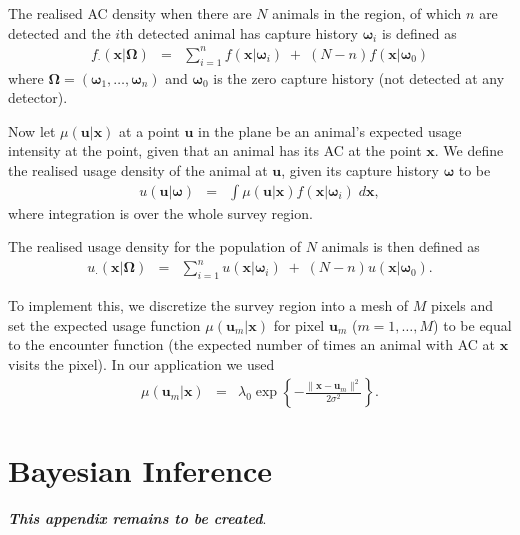 \documentclass[10pt,a4paper]{article}
\begin{document}
The realised AC density when there are $N$ animals in the region, of which $n$ are detected and the $i$th detected animal has capture history $\bm{\omega}_i$ is defined as
\begin{eqnarray*}
f_\cdot(\bm{x}|\bm{\Omega})&=&\sum_{i=1}^nf(\bm{x}|\bm{\omega}_i)\;+\;(N-n)f(\bm{x}|\bm{\omega}_0)
\end{eqnarray*}
\noindent
where $\bm{\Omega}=(\bm{\omega}_1,\ldots,\bm{\omega}_n)$ and $\bm{\omega}_0$ is the zero capture history (not detected at any detector).

Now let $\mu(\bm{u}|\bm{x})$ at a point $\bm{u}$ in the plane be an animal's expected usage intensity at the point, given that an animal has its AC at the point $\bm{x}$.
We define the realised usage density of the animal at $\bm{u}$, given its capture history $\bm{\omega}$ to be 
\begin{eqnarray*}
u(\bm{u}|\bm{\omega})&=&\int \mu(\bm{u}|\bm{x})f(\bm{x}|\bm{\omega}_i)\;d\bm{x},
\end{eqnarray*}
\noindent
where integration is over the whole survey region.

The realised usage density for the population of $N$ animals is then defined as
\begin{eqnarray*}
u_\cdot(\bm{x}|\bm{\Omega})&=&\sum_{i=1}^nu(\bm{x}|\bm{\omega}_i)\;+\;(N-n)u(\bm{x}|\bm{\omega}_0).
\end{eqnarray*}

To implement this, we discretize the survey region into a mesh of $M$ pixels and set the expected usage function $\mu(\bm{u}_m|\bm{x})$ for pixel $\bm{u}_m$ ($m=1,\ldots,M$) to be equal to the encounter function (the expected number of times an animal with AC at $\bm{x}$ visits the pixel). In our application we used
\begin{eqnarray*}
\mu(\bm{u}_m|\bm{x})&=&\lambda_0\exp\left\{-\frac{\lVert \bm{x}-\bm{u}_m\rVert^2}{2\sigma^2}\right\}.
\end{eqnarray*}


\section{Bayesian Inference}
\label{appx:Bayesinference}

\textbf{\textit{This appendix remains to be created}}.
\end{document}
